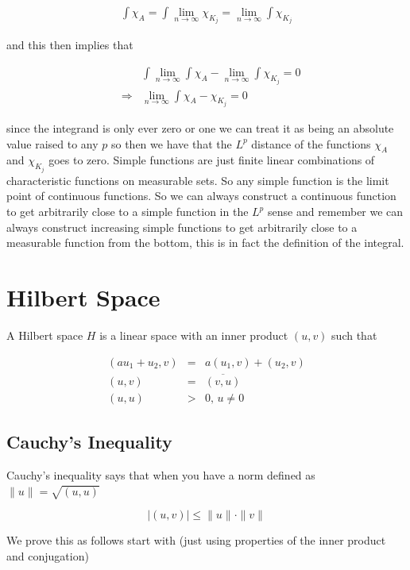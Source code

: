 \documentclass[oneside]{book}
\begin{document}
\begin{eqnarray}
\int \chi_A = \int \lim_{n \to \infty} \chi_{K_j} = \lim_{n \to \infty} \int \chi_{K_j}  
\end{eqnarray}

and this then implies that

\begin{eqnarray}
&&\int \lim_{n \to \infty} \int \chi_A - \lim_{n \to \infty} \int \chi_{K_j}  = 0 \nonumber\\
&\Rightarrow& \lim_{n \to \infty} \int \chi_A - \chi_{K_j}  = 0
\end{eqnarray}

since the integrand is only ever zero or one we can treat it as being an absolute value raised to any $p$ so then we have that the $L^p$ distance of the functions $\chi_A$ and $\chi_{K_j}$ goes to zero. Simple functions are just finite linear combinations of characteristic functions on measurable sets. So any simple function is the limit point of continuous functions. So we can always construct a continuous function to get arbitrarily close to a simple function in the $L^p$ sense and remember we can always construct increasing simple functions to get arbitrarily close to a measurable function from the bottom, this is in fact the definition of the integral. 

\section{Hilbert Space}

A Hilbert space $H$ is a linear space with an inner product $(u,v)$ such that

\begin{eqnarray}
(au_1+u_2,v) &=& a(u_1,v) + (u_2,v)\nonumber\\
(u,v) &=& \overline{(v,u)}\\
(u,u) &>& 0,\,u \neq 0\nonumber
\end{eqnarray}

\subsection{Cauchy's Inequality}
Cauchy's inequality says that when you have a norm defined as $\| u\| = \sqrt{(u,u)}$

\begin{equation}
|(u,v)| \le \|u\| \cdot \|v\|
\end{equation}

We prove this as follows start with (just using properties of the inner product and conjugation)
\end{document}
